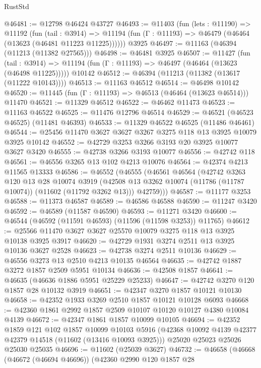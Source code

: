 \begin{lexlean}{RustStd}
\begin{coremodule}
@46481 := @12798 @46424 @43727
@46493 := @11403
    (fun (lets : @11190) =>
    @11192
      (fun (tail : @3914) =>
      @11194 (fun (Γ : @11193) => @46479 (@46464 (@13623 (@46481 @11223 @11225))))))
    @3925
@46497 := @11163 (@46394 (@11213 (@11382 @27565)))
@46498 := @46481 @3925
@46507 := @11427
    (fun (tail : @3914) => @11194 (fun (Γ : @11193) => @46497 (@46464 (@13623 (@46498 @11225)))))
    @10142
@46512 := @46394 (@11213 (@11382 (@13617 (@11222 @10143))))
@46513 := @11163 @46512
@46514 := @46498 @10142
@46520 := @11445 (fun (Γ : @11193) => @46513 (@46464 (@13623 @46514))) @11470
@46521 := @11329 @46512
@46522 := @46462 @11473
@46523 := @11163 @46522
@46525 := @11476 @12796 @46514
@46529 := @46521 (@46523 @46525) (@11481 @46393)
@46533 := @11329 @46522 @46525 (@11486 @46461)
@46544 := @25456 @11470 @3627 @3627 @3267 @3275 @118 @13 @3925 @10079 @3925 @10142
@46552 := @42729 @3253 @3266 @3193 @20 @3925 @10077 @3627 @3420
@46555 := @42738 @3266 @3193 @10077
@46556 := @42742 @118
@46561 := @46556 @3265 @13 @102 @4213 @10076
@46564 := @42374 @4213 @11565 @13333
@46586 := @46552
    (@46555
      (@46561
        @46564
        (@42742
          @3263
          @120
          @13
          @28
          @10074
          @3919
          (@42508 @13 @3262 @10074 (@11786 (@11787 @10074)) (@11602 (@11792 @3262 @13)))
          @42759)))
@46587 := @11177 @3253
@46588 := @11373 @46587
@46589 := @46586 @46588
@46590 := @11247 @3420
@46592 := @46589 (@11587 @46590)
@46593 := @11271 @3420
@46600 := @46544 (@46592 (@11591 @46593) (@11596 (@11598 @3253)) @11765)
@46612 := @25566 @11470 @3627 @3627 @25570 @10079 @3275 @118 @13 @3925 @10138 @3925 @3917
@46620 := @42729 @1931 @3274 @2511 @13 @3925 @10136 @3627 @2528
@46623 := @42738 @3274 @2511 @10136
@46629 := @46556 @3273 @13 @2510 @4213 @10135 @46564
@46635 := @42742 @1887 @3272 @1857 @2509 @5951 @10134
@46636 := @42508 @1857
@46641 := @46635 (@46636 @1886 @5951 @25229 @25233)
@46647 := @42742 @3270 @120 @1857 @28 @10132 @3919
@46651 := @42347 @3270 @1857 @10121 @10130
@46658 := @42352 @1933 @3269 @2510 @1857 @10121 @10128 @6093
@46668 := @42360 @1861 @2992 @1857 @2509 @10107 @10120 @10127 @4380 @10084 @4139
@46672 := @42347 @1861 @1857 @10099 @10105
@46694 := @42352
    @1859
    @121
    @102
    @1857
    @10099
    @10103
    @5916
    (@42368 @10092 @4139 @42377 @42379 @14518 (@11602 (@13416 @10093 @3925)))
    @25020
    @25023
    @25026
    @25030
    @25035
@46696 := @11602 (@25039 @3627)
@46732 := @46658
    (@46668
      (@46672 (@46694 @46696))
      (@42360
        @2990
        @120
        @1857
        @28

\end{coremodule}
\end{lexlean}
